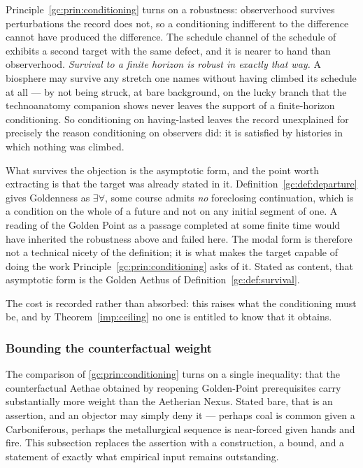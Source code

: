 \begin{remark}\label{gc:rem:finitehorizon}
Principle~\ref{gc:prin:conditioning} turns on a robustness: observerhood
survives perturbations the record does not, so a conditioning
indifferent to the difference cannot have produced the difference. The
schedule channel of the schedule of \cite{GoldenTechnoanatomy} exhibits a second target
with the same defect, and it is nearer to hand than observerhood. \emph{Survival to a finite horizon is robust in exactly that way.} A
biosphere may survive any stretch one names without having climbed its
schedule at all --- by not being struck, at bare background, on the
lucky branch that the technoanatomy companion \cite{GoldenTechnoanatomy} shows never leaves the
support of a finite-horizon conditioning. So conditioning on
having-lasted leaves the record unexplained for precisely the reason
conditioning on observers did: it is satisfied by histories in which
nothing was climbed.

What survives the objection is the asymptotic form, and the point worth
extracting is that the target was already stated in it.
Definition~\ref{gc:def:departure} gives Goldenness as $\exists\forall$, some course admits \emph{no} foreclosing continuation, which is a
condition on the whole of a future and not on any initial segment of
one. A reading of the Golden Point as a passage completed at some finite
time would have inherited the robustness above and failed here. The
modal form is therefore not a technical nicety of the definition; it is
what makes the target capable of doing the work
Principle~\ref{gc:prin:conditioning} asks of it. Stated as content, that
asymptotic form is the Golden Aethus of Definition~\ref{gc:def:survival}.

The cost is recorded rather than absorbed: this raises what the
conditioning must be, and by Theorem~\ref{imp:ceiling} no one is entitled
to know that it obtains.
\end{remark}

\subsubsection{Bounding the counterfactual weight}
\label{gc:subsub:weightbound}

The comparison of \ref{gc:prin:conditioning} turns on a single inequality:
that the counterfactual Aethae obtained by reopening Golden-Point
prerequisites carry substantially more weight than the Aetherian Nexus.
Stated bare, that is an assertion, and an objector may simply deny it ---
perhaps coal is common given a Carboniferous, perhaps the metallurgical
sequence is near-forced given hands and fire. This subsection replaces
the assertion with a construction, a bound, and a statement of exactly
what empirical input remains outstanding.

